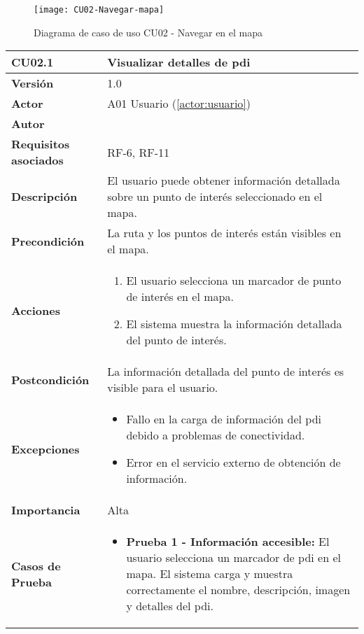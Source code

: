 \begin{figure}[H]
	\centering
	\texttt{[image: CU02-Navegar-mapa]}
	\caption{Diagrama de caso de uso CU02 - Navegar en el mapa}
	\label{CU02-Navegar-mapa}
\end{figure}



\begin{table}[H]
	\centering
	\begin{tabularx}{\linewidth}{ p{} p{} }
		\toprule
		\textbf{CU02.1}    & \textbf{Visualizar detalles de \acrfull{pdi}} \\
		\toprule
		\textbf{Versión}              & 1.0    \\
		\textbf{Actor}                & A01 Usuario (\ref{actor:usuario}) \\
		\textbf{Autor}                & \autor \\
		\textbf{Requisitos asociados} & RF-6, RF-11 \\
		\textbf{Descripción}          & El usuario puede obtener información detallada sobre un punto de interés seleccionado en el mapa. \\
		\textbf{Precondición}         & La ruta y los puntos de interés están visibles en el mapa. \\
		\textbf{Acciones}             &
		\begin{enumerate}
			\def\labelenumi{\arabic{enumi}.}
			\tightlist
			\item El usuario selecciona un marcador de punto de interés en el mapa.
			\item El sistema muestra la información detallada del punto de interés.
		\end{enumerate}\\
		\textbf{Postcondición}        & La información detallada del punto de interés es visible para el usuario. \\
		\textbf{Excepciones}          & 
		\begin{itemize}
			\tightlist
			\item Fallo en la carga de información del \acrlong{pdi} debido a problemas de conectividad.
			\item Error en el servicio externo de obtención de información.
		\end{itemize}\\
		\textbf{Importancia}          & Alta \\
		\textbf{Casos de Prueba}      &
		\begin{itemize}
			\item \textbf{Prueba 1 - Información accesible:} El usuario selecciona un marcador de \acrshort{pdi} en el mapa. El sistema carga y muestra correctamente el nombre, descripción, imagen y detalles del \acrlong{pdi}.

\end{itemize}
\end{tabularx}
\end{table}
